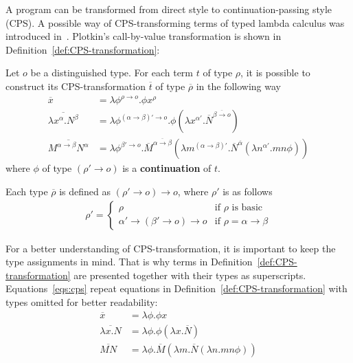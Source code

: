 A program can be transformed from direct style to continuation-passing style (CPS).
A possible way of CPS-transforming terms of typed lambda calculus was introduced in~\cite{Plotkin:1975:Call-by-Name-Call-by-Value-and-the-lambda-Calculus}. Plotkin's call-by-value transformation is shown in Definition~\ref{def:CPS-transformation}: 
\begin{definition}\label{def:CPS-transformation} Let $o$ be a distinguished type. For each term $t$ of type $\rho$, it is possible to construct its CPS-transformation $\overline{t}$ of type $\overline{\rho}$ in the following way
%
\begin{align*}
\overline{x} & = \lambda \phi^{\rho \rightarrow o}. \phi x^{\rho}  \\
\overline{\lambda x^{\alpha}.N^{\beta}} & = \lambda \phi^{(\alpha \rightarrow \beta)' \rightarrow o}. \phi  (\lambda x^{\alpha'}. \overline{N}^{\overline{\beta \rightarrow o}}) \\
\overline{M^{\alpha \rightarrow \beta}N^\alpha} & = \lambda \phi^{\beta' \rightarrow o}. \overline{M}^{\overline{\alpha \rightarrow \beta} }(\lambda m^{(\alpha \rightarrow \beta)'}. \overline{N}^{\overline{\alpha}}(\lambda n^{\alpha'}.mn \phi)) 
\end{align*}
%
where $\phi$ of type $(\rho' \rightarrow o)$ is a \textbf{continuation} of $t$.

Each type  $\overline{\rho}$ is defined as $(\rho' \rightarrow o) \rightarrow o$, where $\rho'$ is as follows
%
\begin{align*}
\rho' = \left\{
\begin{array}{rl} 
\rho & \text{if } \rho \text{ is basic}\\
{\alpha'} \rightarrow ({\beta}' \rightarrow o) \rightarrow o & \text{if } \rho = \alpha \rightarrow \beta \end{array} \right.
\end{align*}
\end{definition}

For a better understanding of CPS-transformation, it is important to keep the type assignments in mind. That is why terms in Definition~\ref{def:CPS-transformation} are presented together with their types as superscripts. Equations~\eqref{eqs:cps} repeat equations in Definition~\ref{def:CPS-transformation} with types omitted for better readability:
%
\begin{subequations}
\begin{align}
\overline{x} & = \lambda \phi. \phi x \label{eq:var}  \\
\overline{\lambda x.N} & = \lambda \phi. \phi (\lambda x. \overline{N}) \label{eq:abst}\\
\overline{MN} & = \lambda \phi. \overline{M}(\lambda m. \overline{N}(\lambda n.mn \phi)) \label{eq:app}
\end{align} \label{eqs:cps}
\end{subequations}

